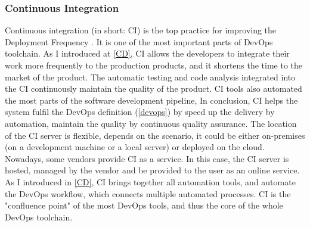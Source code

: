 \subsubsection{Continuous Integration}
Continuous integration (in short: CI) is the top practice for improving the Deployment Frequency \cite{velasquez2014state}. It is one of the most important parts of DevOps toolchain. As I introduced at \ref{CD}, CI allows the developers to integrate their work more frequently to the production products, and it shortens the time to the market of the product. The automatic testing and code analysis integrated into the CI continuously maintain the quality of the product. CI tools also automated the most parts of the software development pipeline, In conclusion, CI helps the system fulfil the DevOps definition (\ref{devops}) by speed up the delivery by automation, maintain the quality by continuous quality assurance. 
The location of the CI server is flexible, depends on the scenario, it could be either on-premises (on a development machine or a local server) or deployed on the cloud. Nowadays, some vendors provide CI as a service. In this case, the CI server is hosted, managed by the vendor and be provided to the user as an online service. As I introduced in \ref{CD}, CI brings together all automation tools, and automate the DevOps workflow, which connects multiple automated processes. CI is the "confluence point" of the most DevOps tools, and thus the core of the whole DevOps toolchain.
